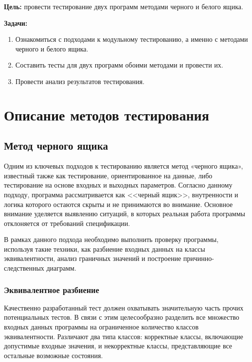 \documentclass{article}[14pt]
\begin{document}
\noindent \textbf{Цель:} провести тестирование двух программ методами черного и белого ящика.

\noindent \textbf{Задачи:}

\begin{enumerate}
    \item Ознакомиться с подходами к модульному тестированию, а именно с методами черного и белого ящика.
    \item Составить тесты для двух программ обоими методами и провести их.
    \item Провести анализ результатов тестирования.
\end{enumerate}

\pagebreak

\section{Описание методов тестирования}

\subsection{Метод черного ящика}

Одним из ключевых подходов к тестированию является метод «черного ящика», известный также как тестирование, 
ориентированное на данные, либо тестирование на основе входных и выходных параметров. Согласно данному подходу, 
программа рассматривается как <<черный ящик>>, внутренности и логика которого остаются скрыты и не 
принимаются во внимание. Основное внимание уделяется выявлению ситуаций, в которых реальная работа программы отклоняется 
от требований спецификации.

В рамках данного подхода необходимо выполнить проверку программы, используя такие техники, как разбиение входных данных на 
классы эквивалентности, анализ граничных значений и построение причинно-следственных диаграмм.

\subsubsection{Эквивалентное разбиение}

Качественно разработанный тест должен охватывать значительную часть прочих потенциальных тестов. В связи с этим 
целесообразно разделить все множество входных данных программы на ограниченное количество классов эквивалентности. 
Различают два типа классов: корректные классы, включающие допустимые входные значения, и некорректные классы, 
представляющие все остальные возможные состояния.
\end{document}
